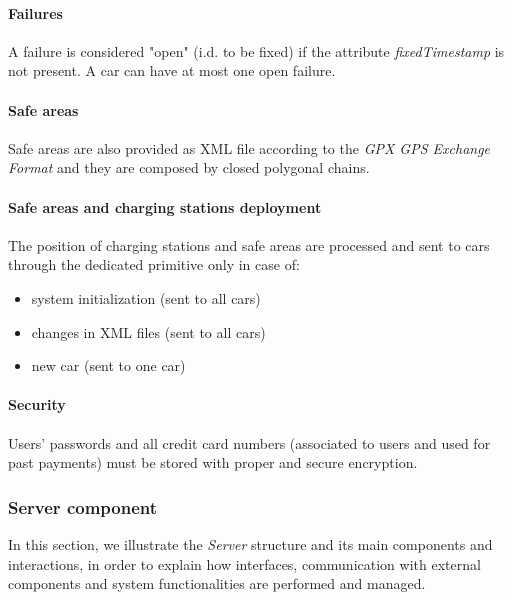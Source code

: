 \paragraph{Failures}A failure is considered "open" (i.d. to be fixed) if the attribute \emph{fixedTimestamp} is not present. A car can have at most one open failure.

\paragraph{Safe areas}Safe areas are also provided as XML file according to the \emph{GPX GPS Exchange Format} \cite{gpx} and they are composed by closed polygonal chains.

\paragraph{Safe areas and charging stations deployment}The position of charging stations and safe areas are processed and sent to cars through the dedicated primitive only in case of:
\begin{itemize}
	\item system initialization (sent to all cars)
	\item changes in XML files (sent to all cars)
	\item new car (sent to one car)
\end{itemize}

\paragraph{Security}Users' passwords and all credit card numbers (associated to users and used for past payments) must be stored with proper and secure encryption.

\clearpage
\subsubsection{Server component}
In this section, we illustrate the \emph{Server} structure and its main components and interactions, in order to explain how interfaces, communication with external components and system functionalities are performed and managed.
\\

